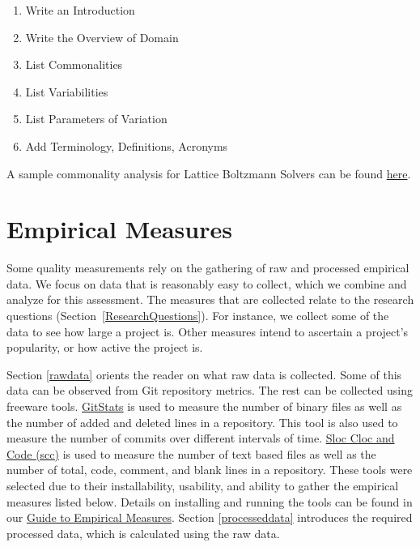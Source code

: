 \documentclass[letterpaper,cleveref]{lipics-v2019}
\theoremstyle{definition}
\begin{document}
\begin{enumerate}
\item Write an Introduction
\item Write the Overview of Domain
\item List Commonalities
\item List Variabilities
\item List Parameters of Variation
\item Add Terminology, Definitions, Acronyms
\end{enumerate}

A sample commonality analysis for Lattice Boltzmann Solvers can be found
\href{https://github.com/smiths/AIMSS/blob/master/StateOfPractice/Peter-Notes/Commonality-Analysis-LB-Systems.pdf}
{here}.

\section{Empirical Measures} \label{SecEmpiricalMeasures}

Some quality measurements rely on the gathering of raw and processed empirical
data. We focus on data that is reasonably easy to collect, which we combine and
analyze for this assessment. The measures that are collected relate to the
research questions (Section~\ref{ResearchQuestions}). For instance, we collect some of the
data to see how large a project is. Other measures intend to ascertain a
project’s popularity, or how active the project is.  

Section \ref{rawdata} orients the reader on what raw data is collected.  Some of this data can be
observed from Git repository metrics. The rest can be collected using freeware
tools. \href{https://github.com/tomgi/git_stats}{GitStats} is used to measure
the number of binary files as well as the number of added and deleted lines in a
repository. This tool is also used to measure the number of commits over
different intervals of time. \href{https://github.com/boyter/scc}{Sloc Cloc and
  Code (scc)} is used to measure the number of text based files as well as the
number of total, code, comment, and blank lines in a repository. These tools
were selected due to their installability, usability, and ability to gather the
empirical measures listed below. Details on installing and running the tools can
be found in our 
\href{https://github.com/smiths/AIMSS/blob/master/StateOfPractice/Methodology/A
  Guide to Empirical Measures.pdf} {Guide to Empirical Measures}. Section \ref{processeddata}
introduces the required processed data, which is calculated using the raw data.
\end{document}

